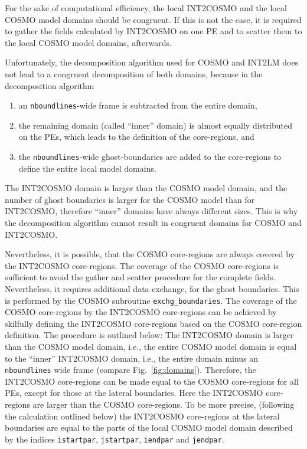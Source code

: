 \documentclass[11pt,twoside]{article}
\begin{document}
For the sake of computational efficiency, the local INT2COSMO and the local
COSMO model domains should be congruent.
If this is not the case, it is required to gather the fields calculated by
 INT2COSMO on one PE and to scatter them to the local COSMO model
 domains, afterwards.

Unfortunately, the decomposition algorithm used for COSMO and INT2LM does not
lead to a congruent decomposition of both domains, because in
 the decomposition algorithm
\begin{enumerate}
\item an \verb|nboundlines|-wide frame is subtracted from the entire domain, 
\item the remaining domain (called ``inner'' domain) is almost equally 
distributed on the PEs, which leads to the definition of the core-regions, and 
\item the \verb|nboundlines|-wide ghost-boundaries are added to the core-regions
 to define the entire local model domains.
\end{enumerate}
The INT2COSMO domain is larger than the COSMO model domain, and the 
number of ghost boundaries is larger for the COSMO model than for INT2COSMO, 
therefore ``inner'' domains have always different sizes. This is why the
decomposition algorithm cannot result in congruent domains for COSMO and
INT2COSMO.

Nevertheless, it is possible, that the COSMO core-regions are always covered by
the INT2COSMO core-regions.  The coverage of the COSMO core-regions is 
sufficient to avoid the gather and scatter procedure for the complete fields. 
Nevertheless, it requires additional data exchange, for the ghost boundaries.
 This is performed by the COSMO subroutine \verb|exchg_boundaries|.
The coverage of the COSMO core-regions by the INT2COSMO core-regions
can be achieved by skilfully defining the
INT2COSMO core-regions based on the COSMO core-region definition.
The procedure is outlined below:
The INT2COSMO domain is larger than the COSMO model domain, i.e., the 
entire COSMO model domain is equal to the ``inner'' INT2COSMO
domain, i.e., the entire domain minus an \verb|nboundlines| wide frame
(compare Fig.\ \ref{fig:domains}).
Therefore, the INT2COSMO core-regions can be made equal to the
COSMO core-regions for all PEs, except for those at the lateral boundaries. Here
the INT2COSMO core-regions are larger than the COSMO core-regions. 
To be more precise, (following the calculation outlined below) the INT2COSMO 
core-regions at the lateral boundaries are equal to the parts of the local
COSMO model domain described by the indices 
\verb|istartpar|, \verb|jstartpar|, \verb|iendpar| and \verb|jendpar|.
\end{document}
